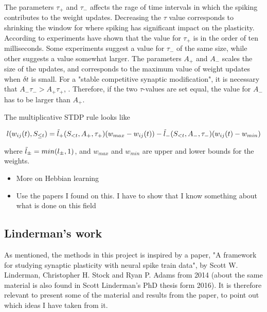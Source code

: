 The parameters $\tau_+$ and $\tau_-$ affects the rage of time intervals in which the spiking contributes to the weight updates. Decreasing the $\tau$ value corresponds to shrinking the window for where spiking has significant impact on the plasticity. According to \cite{Song} experiments have shown that the value for $\tau_+$ is in the order of ten milliseconds. Some experiments suggest a value for $\tau_-$ of the same size, while other suggests a value somewhat larger. The parameters $A_+$ and $A_-$ scales the size of the updates, and corresponds to the maximum value of weight updates when $\delta t$ is small. For a "stable competitive synaptic modification", it is necessary that $A_-\tau_- > A_+\tau_+$, \cite{Song}. Therefore, if the two $\tau$-values are set equal, the value for $A_-$ has to be larger than $A_+$.

The multiplicative STDP rule looks like

\begin{equation}
    l(w_{ij}(t), S_{\leq t}) = \Tilde{l}_+(S_{<t}, A_+,\tau_+)(w_{max} - w_{ij}(t))  - \Tilde{l}_-(S_{<t}, A_-,\tau_-)(w_{ij}(t) - w_{min})
\end{equation}

where $\Tilde{l}_{\pm} = min(l_{\pm},1)$, and $w_{max}$ and $w_{min}$ are upper and lower bounds for the weights. 

\begin{itemize}
    \item More on Hebbian learning
    \item Use the papers I found on this. I have to show that I know something about what is done on this field
\end{itemize}


\subsection{Linderman's work}
\label{Linderman}
As mentioned, the methods in this project is inspired by a paper, "A framework for studying synaptic plasticity with neural spike train data", by Scott W. Linderman, Christopher H. Stock and Ryan P. Adams from 2014 (about the same material is also found in Scott Linderman's PhD thesis form 2016). It is therefore relevant to present some of the material and results from the paper, to point out which ideas I have taken from it. 













\cleardoublepage
